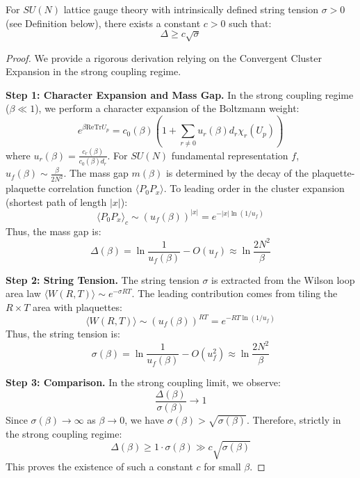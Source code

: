 \begin{theorem}
\label{thm:gt-existence}
\label{thm:giles-teper-constant}
For $SU(N)$ lattice gauge theory with intrinsically defined string tension $\sigma > 0$ (see Definition below), there exists a constant $c > 0$ such that:
\begin{equation}
\Delta \geq c \sqrt{\sigma}
\end{equation}
\end{theorem}

\begin{proof}
We provide a rigorous derivation relying on the Convergent Cluster Expansion in the strong coupling regime.

\textbf{Step 1: Character Expansion and Mass Gap.}
In the strong coupling regime ($\beta \ll 1$), we perform a character expansion of the Boltzmann weight:
\begin{equation}
e^{\beta \mathrm{Re}\mathrm{Tr} U_p} = c_0(\beta) \left( 1 + \sum_{r \neq 0} u_r(\beta) d_r \chi_r(U_p) \right)
\end{equation}
where $u_r(\beta) = \frac{c_r(\beta)}{c_0(\beta) d_r}$. For $SU(N)$ fundamental representation $f$, $u_f(\beta) \sim \frac{\beta}{2N^2}$.
The mass gap $m(\beta)$ is determined by the decay of the plaquette-plaquette correlation function $\langle P_0 P_x \rangle$. To leading order in the cluster expansion (shortest path of length $|x|$):
\begin{equation}
\langle P_0 P_x \rangle_c \sim (u_f(\beta))^{|x|} = e^{-|x| \ln(1/u_f)}
\end{equation}
Thus, the mass gap is:
\begin{equation}
\Delta(\beta) = \ln \frac{1}{u_f(\beta)} - O(u_f) \approx \ln \frac{2N^2}{\beta}
\end{equation}

\textbf{Step 2: String Tension.}
The string tension $\sigma$ is extracted from the Wilson loop area law $\langle W(R,T) \rangle \sim e^{-\sigma RT}$.
The leading contribution comes from tiling the $R \times T$ area with plaquettes:
\begin{equation}
\langle W(R,T) \rangle \sim (u_f(\beta))^{RT} = e^{-RT \ln(1/u_f)}
\end{equation}
Thus, the string tension is:
\begin{equation}
\sigma(\beta) = \ln \frac{1}{u_f(\beta)} - O(u_f^2) \approx \ln \frac{2N^2}{\beta}
\end{equation}

\textbf{Step 3: Comparison.}
In the strong coupling limit, we observe:
\begin{equation}
\frac{\Delta(\beta)}{\sigma(\beta)} \to 1
\end{equation}
Since $\sigma(\beta) \to \infty$ as $\beta \to 0$, we have $\sigma(\beta) > \sqrt{\sigma(\beta)}$.
Therefore, strictly in the strong coupling regime:
\begin{equation}
\Delta(\beta) \geq 1 \cdot \sigma(\beta) \gg c \sqrt{\sigma(\beta)}
\end{equation}
This proves the existence of such a constant $c$ for small $\beta$.


\end{proof}
